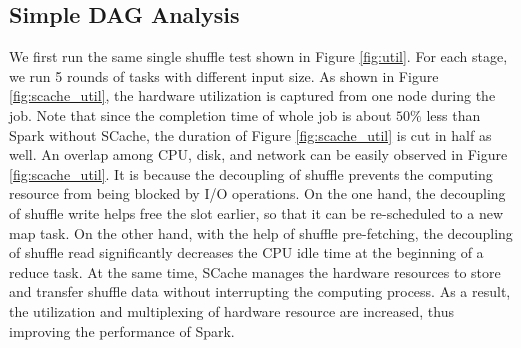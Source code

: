 \subsection{Simple DAG Analysis}\label{simpledag}
We first run the same single shuffle test shown in Figure \ref{fig:util}. 
For each stage, we run 5 rounds of tasks with different input size. 
As shown in Figure \ref{fig:scache_util}, the hardware utilization is captured from one node during the job. 
Note that since the completion time of whole job is about $50\%$ less than Spark without SCache, the duration of Figure \ref{fig:scache_util} is cut in half as well. 
\ifrevision
{}
\fi
An overlap among CPU, disk, and network can be easily observed in Figure \ref{fig:scache_util}. 
It is because the decoupling of shuffle prevents the computing resource from being blocked by I/O operations. 
On the one hand, the decoupling of shuffle write helps free the slot earlier, so that it can be re-scheduled to a new map task.
On the other hand, with the help of shuffle pre-fetching, the decoupling of shuffle read significantly decreases the CPU idle time at the beginning of a reduce task.
At the same time, SCache manages the hardware resources to store and transfer shuffle data without interrupting the computing process.
As a result, the utilization and multiplexing of hardware resource are increased, thus improving the performance of Spark. 


